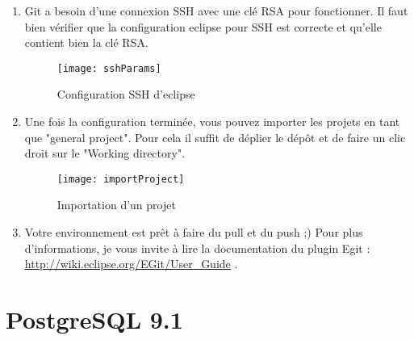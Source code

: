 \begin{enumerate}
	 \item Git a besoin d'une connexion SSH avec une clé RSA pour fonctionner. Il faut
	 bien vérifier que la configuration eclipse pour SSH est correcte et qu'elle contient
	 bien la clé RSA.
		\begin{figure}[!h]
     		\begin{center}
			      \texttt{[image: sshParams]}
			      \caption{Configuration SSH d'eclipse}
			      \label{eclipseSshConfig}
		    \end{center}
		\end{figure}		 
	 
	\item Une fois la configuration terminée, vous pouvez importer les projets en tant que "general project".
	Pour cela il suffit de déplier le dépôt et de faire un clic droit sur le "Working directory".
		\begin{figure}[!h]
     		\begin{center}
			      \texttt{[image: importProject]}
			      \caption{Importation d'un projet}
			      \label{gitProjectImport}
		    \end{center}
		\end{figure}	
		
	\item Votre environnement est prêt à faire du pull et du push ;)   Pour plus  d'informations, je vous invite à lire la
	documentation du plugin Egit : \href{http://wiki.eclipse.org/EGit/User\_Guide}{http://wiki.eclipse.org/EGit/User\_Guide} . 
 
	 
\end{enumerate}

\section{PostgreSQL 9.1}

